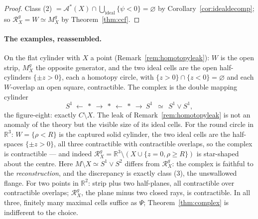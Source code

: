 \documentclass[11pt]{article}
\theoremstyle{remark}
\newcommand{\R}{\mathbb{R}}
\newcommand{\X}{X}
\newcommand{\Mg}{M^{g}_{\X}}
\newcommand{\Rg}{\mathcal{R}^{g}_{\X}}
\newcommand{\Aub}{\mathcal{A}^{\ast}}
\begin{document}
\begin{proof}
Class (2) $=\Aub(\X)\cap\bigcup_{\mathrm{ideal}}\{\psi<0\}
=\varnothing$ by Corollary~\ref{cor:idealdecomp}; so
$\Rg=W\simeq\Mg$ by Theorem~\ref{thm:ccf}.
\end{proof}

\paragraph{The examples, reassembled.} On the flat cylinder with
$\X$ a point (Remark~\ref{rem:homotopyleak}): $W$ is the open strip,
$\Mg$ the opposite generator, and the two ideal cells are the open
half-cylinders $\{\pm z>0\}$, each a homotopy circle, with
$\{z>0\}\cap\{z<0\}=\varnothing$ and each $W$-overlap an open square,
contractible. The complex is the double mapping cylinder
\[
  S^{1}\ \longleftarrow\ \ast\ \longrightarrow\
  \ast\ \longleftarrow\ \ast\ \longrightarrow\ S^{1}
  \ \ \simeq\ \ S^{1}\vee S^{1} ,
\]
the figure-eight: exactly $C\setminus\X$. The leak of
Remark~\ref{rem:homotopyleak} is not an anomaly of the theory but
the visible size of its ideal cells. For the round circle in
$\R^{3}$: $W=\{\rho<R\}$ is the captured solid cylinder, the two
ideal cells are the half-spaces $\{\pm z>0\}$, all three
contractible with contractible overlaps, so the complex is
contractible --- and indeed $\Rg=\R^{3}\setminus(\X\cup
\{z=0,\rho\ge R\})$ is star-shaped about the centre. Here
$M\setminus\X\simeq S^{1}\vee S^{2}$ differs from $\Rg$: the complex
is faithful to the \emph{reconstruction}, and the discrepancy is
exactly class (3), the unswallowed flange. For two points in
$\R^{2}$: strip plus two half-planes, all contractible over
contractible overlaps; $\Rg$, the plane minus two closed rays, is
contractible. In all three, finitely many maximal cells suffice as
$\Psi$; Theorem~\ref{thm:complex} is indifferent to the choice.
\end{document}
